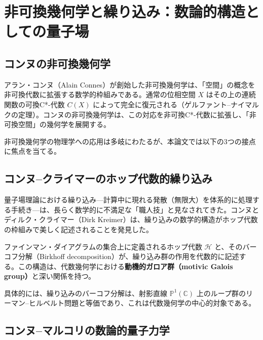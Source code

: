 \documentclass[12pt,a4paper]{ltjsarticle}
\theoremstyle{definition}
\begin{document}
\newpage
\section{非可換幾何学と繰り込み：数論的構造としての量子場}
\label{sec:noncommutative}

\subsection{コンヌの非可換幾何学}

アラン・コンヌ（Alain Connes）が創始した非可換幾何学\cite{Connes1994}は、「空間」の概念を非可換代数に拡張する数学的枠組みである。通常の位相空間 $X$ はその上の連続関数の可換C*-代数 $C(X)$ によって完全に復元される（ゲルファント--ナイマルクの定理）。コンヌの非可換幾何学は、この対応を非可換C*-代数に拡張し、「非可換空間」の幾何学を展開する。

非可換幾何学の物理学への応用は多岐にわたるが、本論文では以下の3つの接点に焦点を当てる。

\subsection{コンヌ--クライマーのホップ代数的繰り込み}

量子場理論における繰り込み---計算中に現れる発散（無限大）を体系的に処理する手続き---は、長らく数学的に不満足な「職人技」と見なされてきた。コンヌとディルク・クライマー（Dirk Kreimer）は、繰り込みの数学的構造がホップ代数の枠組みで美しく記述されることを発見した\cite{ConnesKreimer1998, ConnesKreimer2000, ConnesKreimer2001}。

\begin{keyinsight}
ファインマン・ダイアグラムの集合上に定義されるホップ代数 $\mathcal{H}$ と、そのバーコフ分解（Birkhoff decomposition）が、繰り込み群の作用を代数的に記述する。この構造は、代数幾何学における\textbf{動機的ガロア群（motivic Galois group）}と深い関係を持つ。
\end{keyinsight}

具体的には、繰り込みのバーコフ分解は、射影直線 $\mathbb{P}^1(\mathbb{C})$ 上のループ群のリーマン--ヒルベルト問題と等価であり、これは代数幾何学の中心的対象である\cite{ConnesMarcolli2008}。

\subsection{コンヌ--マルコリの数論的量子力学}
\end{document}
